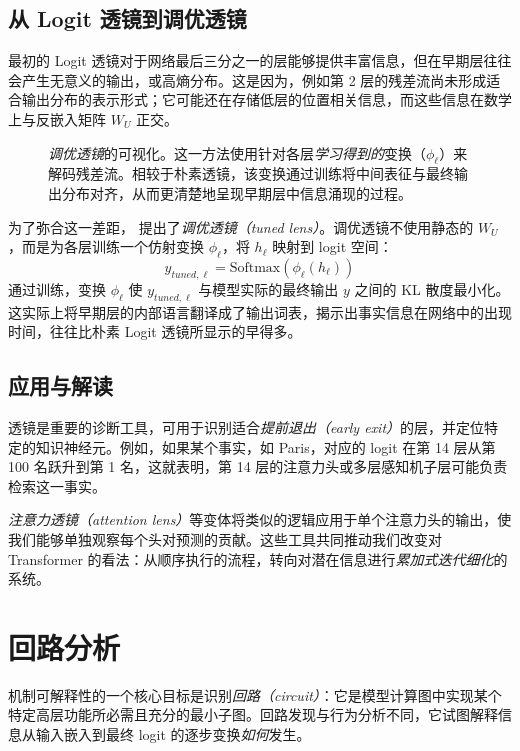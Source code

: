 \subsection{从 Logit 透镜到调优透镜}
最初的 Logit 透镜对于网络最后三分之一的层能够提供丰富信息，但在早期层往往会产生无意义的输出，或高熵分布。这是因为，例如第 2 层的残差流尚未形成适合输出分布的表示形式；它可能还在存储低层的位置相关信息，而这些信息在数学上与反嵌入矩阵 $W_U$ 正交。

\begin{figure}[htbp]
    \centering
    
    \caption{\textit{调优透镜}的可视化。这一方法使用针对各层\emph{学习得到的}变换（$\phi_\ell$）来解码残差流。相较于朴素透镜，该变换通过训练将中间表征与最终输出分布对齐，从而更清楚地呈现早期层中信息涌现的过程。}
    \label{fig:tuned_lens}
\end{figure}

为了弥合这一差距，\citet{belrose2023eliciting} 提出了\textit{调优透镜（tuned lens）}。调优透镜不使用静态的 $W_U$，而是为各层训练一个仿射变换 $\phi_\ell$，将 $h_\ell$ 映射到 logit 空间：
\begin{equation}
    y_{tuned, \ell} = \text{Softmax}(\phi_\ell(h_\ell))
\end{equation}
通过训练，变换 $\phi_\ell$ 使 $y_{tuned, \ell}$ 与模型实际的最终输出 $y$ 之间的 KL 散度最小化。这实际上将早期层的内部语言翻译成了输出词表，揭示出事实信息在网络中的出现时间，往往比朴素 Logit 透镜所显示的早得多。

\subsection{应用与解读}
透镜是重要的诊断工具，可用于识别适合\emph{提前退出（early exit）}的层，并定位特定的知识神经元。例如，如果某个事实，如 Paris，对应的 logit 在第 14 层从第 100 名跃升到第 1 名，这就表明，第 14 层的注意力头或多层感知机子层可能负责检索这一事实。

\emph{注意力透镜（attention lens）}\citep{sakarvadia2023attention}等变体将类似的逻辑应用于单个注意力头的输出，使我们能够单独观察每个头对预测的贡献。这些工具共同推动我们改变对 Transformer 的看法：从顺序执行的流程，转向对潜在信息进行\emph{累加式迭代细化}的系统。



\section{回路分析}

机制可解释性的一个核心目标是识别\emph{回路（circuit）}：它是模型计算图中实现某个特定高层功能所必需且充分的最小子图。回路发现与行为分析不同，它试图解释信息从输入嵌入到最终 logit 的逐步变换\emph{如何}发生。

